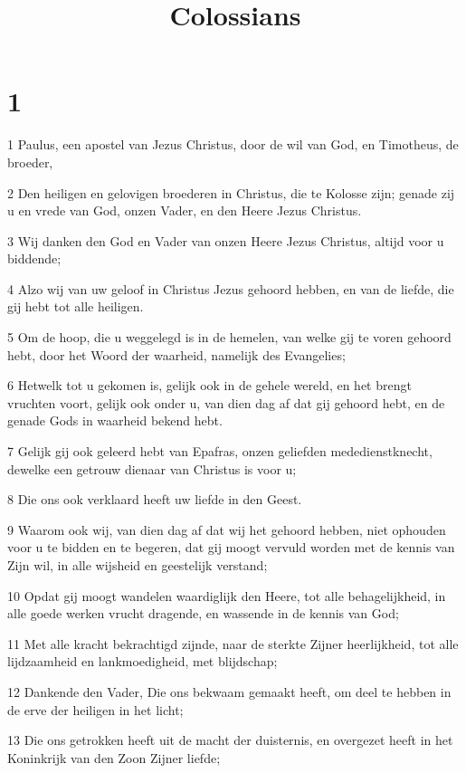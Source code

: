 

\title{Colossians}



\chapter{1}

\par 1 Paulus, een apostel van Jezus Christus, door de wil van God, en Timotheus, de broeder,
\par 2 Den heiligen en gelovigen broederen in Christus, die te Kolosse zijn; genade zij u en vrede van God, onzen Vader, en den Heere Jezus Christus.
\par 3 Wij danken den God en Vader van onzen Heere Jezus Christus, altijd voor u biddende;
\par 4 Alzo wij van uw geloof in Christus Jezus gehoord hebben, en van de liefde, die gij hebt tot alle heiligen.
\par 5 Om de hoop, die u weggelegd is in de hemelen, van welke gij te voren gehoord hebt, door het Woord der waarheid, namelijk des Evangelies;
\par 6 Hetwelk tot u gekomen is, gelijk ook in de gehele wereld, en het brengt vruchten voort, gelijk ook onder u, van dien dag af dat gij gehoord hebt, en de genade Gods in waarheid bekend hebt.
\par 7 Gelijk gij ook geleerd hebt van Epafras, onzen geliefden mededienstknecht, dewelke een getrouw dienaar van Christus is voor u;
\par 8 Die ons ook verklaard heeft uw liefde in den Geest.
\par 9 Waarom ook wij, van dien dag af dat wij het gehoord hebben, niet ophouden voor u te bidden en te begeren, dat gij moogt vervuld worden met de kennis van Zijn wil, in alle wijsheid en geestelijk verstand;
\par 10 Opdat gij moogt wandelen waardiglijk den Heere, tot alle behagelijkheid, in alle goede werken vrucht dragende, en wassende in de kennis van God;
\par 11 Met alle kracht bekrachtigd zijnde, naar de sterkte Zijner heerlijkheid, tot alle lijdzaamheid en lankmoedigheid, met blijdschap;
\par 12 Dankende den Vader, Die ons bekwaam gemaakt heeft, om deel te hebben in de erve der heiligen in het licht;
\par 13 Die ons getrokken heeft uit de macht der duisternis, en overgezet heeft in het Koninkrijk van den Zoon Zijner liefde;
